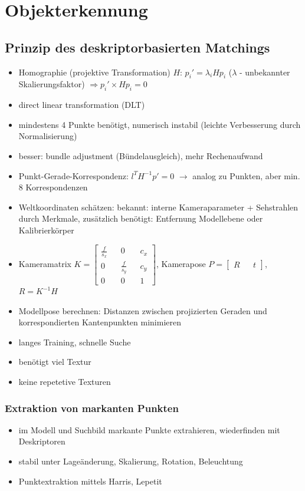 \documentclass[11pt]{article}
\begin{document}
\section{Objekterkennung}

\subsection{Prinzip des deskriptorbasierten Matchings}

\begin{itemize}
    \item Homographie (projektive Transformation) $H$: $p_i' = \lambda_i Hp_i$ ($\lambda$ - unbekannter Skalierungsfaktor) $\Rightarrow p_i' \times Hp_i = 0$
    \item direct linear transformation (DLT)
    \item mindestens 4 Punkte benötigt, numerisch instabil (leichte Verbesserung durch Normalisierung)
    \item besser: bundle adjustment (Bündelausgleich), mehr Rechenaufwand
    \item Punkt-Gerade-Korrespondenz: $l^T H^{-1} p' = 0$ $\rightarrow$ analog zu Punkten, aber min. 8 Korrespondenzen
    \item Weltkoordinaten schätzen: bekannt: interne Kameraparameter + Sehstrahlen durch Merkmale, zusätzlich benötigt: Entfernung Modellebene oder Kalibrierkörper
    \item Kameramatrix $K = \begin{bmatrix} \frac{f}{s_x} && 0 && c_x \\ 0 && \frac{f}{s_y} && c_y \\ 0 && 0 && 1 \end{bmatrix}$, Kamerapose $P = \begin{bmatrix} R && t \end{bmatrix}$, $R = K^{-1}H$
    \item Modellpose berechnen: Distanzen zwischen projizierten Geraden und korrespondierten Kantenpunkten minimieren
    \item langes Training, schnelle Suche
    \item benötigt viel Textur
    \item keine repetetive Texturen
\end{itemize}

\subsubsection{Extraktion von markanten Punkten}
\begin{itemize}
    \item im Modell und Suchbild markante Punkte extrahieren, wiederfinden mit Deskriptoren
    \item stabil unter Lageänderung, Skalierung, Rotation, Beleuchtung
    \item Punktextraktion mittels Harris, Lepetit
\end{itemize}
\end{document}
